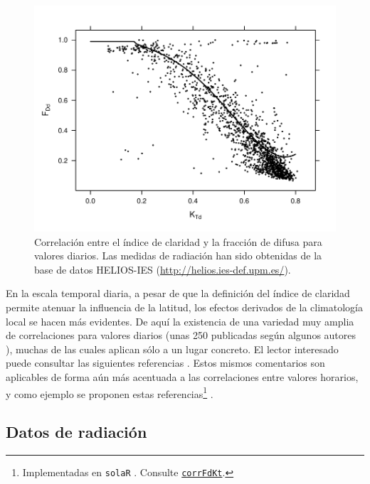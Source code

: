 %
\begin{figure}
\includegraphics[scale=0.75]{../figs/FdKtDiario}

\caption{Correlación entre el índice de claridad y la fracción de difusa para
valores diarios. Las medidas de radiación han sido obtenidas de la
base de datos HELIOS-IES (\protect\url{http://helios.ies-def.upm.es/}).\label{fig:KtFDd}}

\end{figure}


En la escala temporal diaria, a pesar de que la definición del índice
de claridad permite atenuar la influencia de la latitud, los efectos
derivados de la climatología local se hacen más evidentes. De aquí
la existencia de una variedad muy amplia de correlaciones para valores
diarios (unas 250 publicadas según algunos autores \cite{Miguel.Bilbao.ea2001}),
muchas de las cuales aplican sólo a un lugar concreto. El lector interesado
puede consultar las siguientes referencias \cite{Miguel.Bilbao.ea2001,Soler1990,Gopinathan.Soler1995,Macagnan1993}.
Estos mismos comentarios son aplicables de forma aún más acentuada
a las correlaciones entre valores horarios, y como ejemplo se proponen
estas referencias\footnote{Implementadas en \texttt{solaR} \cite{Perpinan2012b}. Consulte \href{http://search.r-project.org/R/library/solaR/html/corrFdKt.html}{\texttt{corrFdKt}}.} \cite{Collares-Pereira.Rabl1979, Erbs.Klein.ea1982, Ridley.Boland.ea2010}.


\subsection{Datos de radiación}

